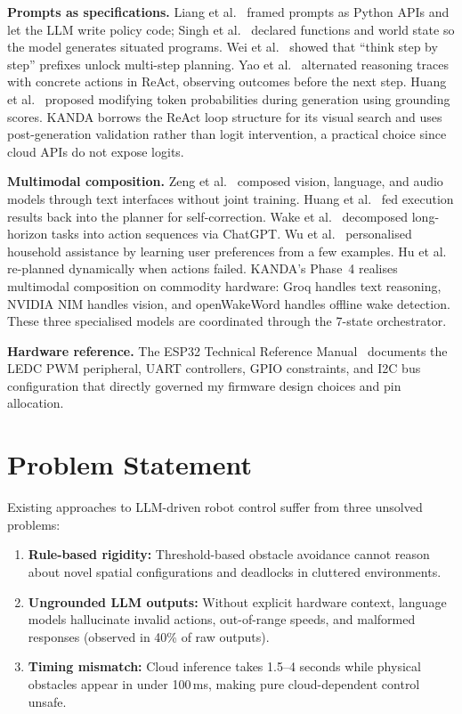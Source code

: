 \textbf{Prompts as specifications.} Liang et al.~\cite{liang2023code} framed prompts as Python APIs and let the LLM write policy code; Singh et al.~\cite{singh2023progprompt} declared functions and world state so the model generates situated programs. Wei et al.~\cite{wei2022cot} showed that ``think step by step'' prefixes unlock multi-step planning. Yao et al.~\cite{yao2023react} alternated reasoning traces with concrete actions in ReAct, observing outcomes before the next step. Huang et al.~\cite{huang2023grounded} proposed modifying token probabilities during generation using grounding scores. KANDA borrows the ReAct loop structure for its visual search and uses post-generation validation rather than logit intervention, a practical choice since cloud APIs do not expose logits.

\textbf{Multimodal composition.} Zeng et al.~\cite{zeng2023socratic} composed vision, language, and audio models through text interfaces without joint training. Huang et al.~\cite{huang2022innermonologue} fed execution results back into the planner for self-correction. Wake et al.~\cite{wake2023gptrobot} decomposed long-horizon tasks into action sequences via ChatGPT. Wu et al.~\cite{wu2023tidybot} personalised household assistance by learning user preferences from a few examples. Hu et al.~\cite{hu2023llmplanner} re-planned dynamically when actions failed. KANDA's Phase~4 realises multimodal composition on commodity hardware: Groq handles text reasoning, NVIDIA NIM handles vision, and openWakeWord handles offline wake detection. These three specialised models are coordinated through the 7-state orchestrator.

\textbf{Hardware reference.} The ESP32 Technical Reference Manual~\cite{espressif2023esp32} documents the LEDC PWM peripheral, UART controllers, GPIO constraints, and I2C bus configuration that directly governed my firmware design choices and pin allocation.

\section{Problem Statement}
\label{sec:problem}

Existing approaches to LLM-driven robot control suffer from three unsolved problems:

\begin{enumerate}[nosep]
  \item \textbf{Rule-based rigidity:} Threshold-based obstacle avoidance cannot reason about novel spatial configurations and deadlocks in cluttered environments.
  \item \textbf{Ungrounded LLM outputs:} Without explicit hardware context, language models hallucinate invalid actions, out-of-range speeds, and malformed responses (observed in 40\% of raw outputs).
  \item \textbf{Timing mismatch:} Cloud inference takes 1.5--4 seconds while physical obstacles appear in under 100\,ms, making pure cloud-dependent control unsafe.
\end{enumerate}

